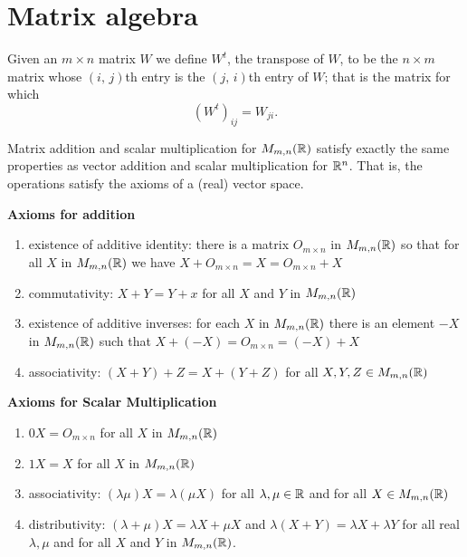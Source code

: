 \documentclass[10pt, a4paper]{article}
\begin{document}
\section{Matrix algebra}

\begin{definition}[Transpose]
    Given an $m \times n$ matrix $W$ we define $W ^ t$, the transpose of $W$, to be the $n \times m$ matrix whose $(i,\,j)$th entry is the $(j,\,i)$th entry of $W$; that is the matrix for which
    \[
    (W ^ t)_{ij} = W_{ji}.
    \]
\end{definition}

\begin{proposition}
    Matrix addition and scalar multiplication for $M_{m, n}(\mathbb{R})$ satisfy exactly the same properties as vector addition and scalar multiplication for $\mathbb{R} ^ n$. That is, the operations satisfy the axioms of a (real) vector space.

    \textbf{Axioms for addition}
    \begin{enumerate}[label = (\roman*)]
        \item existence of additive identity: there is a matrix $O_{m \times n}$ in $M_{m, n}(\mathbb{R})$ so that for all $X$ in $M_{m, n}(\mathbb{R})$ we have $X + O_{m \times n} = X = O_{m \times n} + X$ 
        \item commutativity: $X + Y = Y + x$ for all $X$ and $Y$ in $M_{m, n}(\mathbb{R})$
        \item existence of additive inverses: for each $X$ in $M_{m, n}(\mathbb{R})$ there is an element $-X$ in $M_{m, n}(\mathbb{R})$ such that $X + (-X) = O_{m \times n} = (-X) + X$
        \item associativity: $(X + Y) + Z = X + (Y + Z)$ for all $X, Y, Z \in M_{m, n}(\mathbb{R})$
    \end{enumerate}

    \textbf{Axioms for Scalar Multiplication}
    \begin{enumerate}[label = (\roman*)]
        \item $0X = O_{m \times n}$ for all $X$ in $M_{m, n}(\mathbb{R})$
        \item $1X = X$ for all $X$ in $M_{m, n}(\mathbb{R})$
        \item associativity: $(\lambda\mu)X = \lambda(\mu X)$ for all $\lambda, \mu \in \mathbb{R}$ and for all $X \in M_{m, n}(\mathbb{R})$
        \item distributivity: $(\lambda + \mu)X = \lambda X + \mu X$ and $\lambda (X + Y) = \lambda X + \lambda Y$ for all real $\lambda, \mu$ and for all $X$ and $Y$ in $M_{m, n}(\mathbb{R})$.
    \end{enumerate}
\end{proposition}
\end{document}
